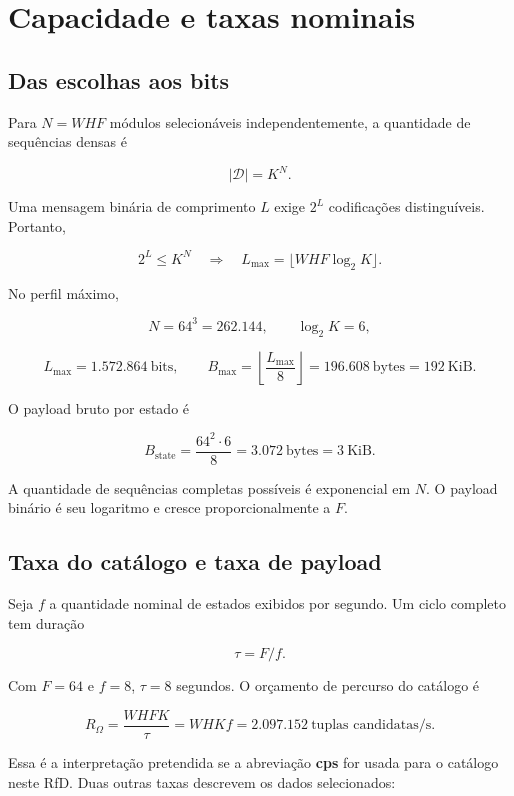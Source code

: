 \documentclass[
  11pt,
  a4paper,
]{article}
\begin{document}
\hypertarget{capacidade-e-taxas-nominais}{%
\section{Capacidade e taxas
nominais}\label{capacidade-e-taxas-nominais}}

\hypertarget{das-escolhas-aos-bits}{%
\subsection{Das escolhas aos bits}\label{das-escolhas-aos-bits}}

Para \(N=WHF\) módulos selecionáveis independentemente, a quantidade de
sequências densas é

\[
|\mathcal D|=K^N.
\]

Uma mensagem binária de comprimento \(L\) exige \(2^L\) codificações
distinguíveis. Portanto,

\[
2^L\le K^N
\quad\Longrightarrow\quad
L_{\max}=\lfloor WHF\log_2K\rfloor.
\]

No perfil máximo,

\[
N=64^3=262.144,\qquad
\log_2K=6,
\]

\[
L_{\max}=1.572.864\ \text{bits},
\qquad
B_{\max}=\left\lfloor\frac{L_{\max}}8\right\rfloor
=196.608\ \text{bytes}=192\ \text{KiB}.
\]

O payload bruto por estado é

\[
B_{\mathrm{state}}=\frac{64^2\cdot6}{8}
=3.072\ \text{bytes}=3\ \text{KiB}.
\]

A quantidade de sequências completas possíveis é exponencial em \(N\). O
payload binário é seu logaritmo e cresce proporcionalmente a \(F\).

\hypertarget{taxa-do-catuxe1logo-e-taxa-de-payload}{%
\subsection{Taxa do catálogo e taxa de
payload}\label{taxa-do-catuxe1logo-e-taxa-de-payload}}

Seja \(f\) a quantidade nominal de estados exibidos por segundo. Um
ciclo completo tem duração

\[
\tau=F/f.
\]

Com \(F=64\) e \(f=8\), \(\tau=8\) segundos. O orçamento de percurso do
catálogo é

\[
R_{\Omega}=\frac{WHFK}{\tau}
=WHKf=2.097.152
\ \text{tuplas candidatas/s}.
\]

Essa é a interpretação pretendida se a abreviação \textbf{cps} for usada
para o catálogo neste RfD. Duas outras taxas descrevem os dados
selecionados:
\end{document}
